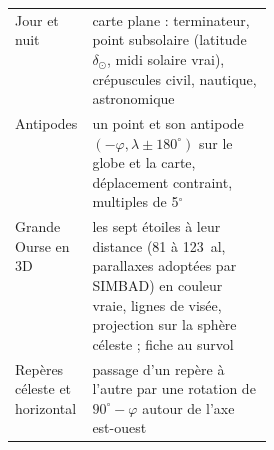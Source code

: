 \begin{center}
\begin{tabularx}{\linewidth}{@{}>{\raggedright}p{0.30\linewidth}X@{}}
Jour et nuit & carte plane : terminateur, point subsolaire (latitude $\delta_\odot$, midi solaire vrai), crépuscules civil, nautique, astronomique\\
Antipodes & un point et son antipode $(-\varphi, \lambda\pm180^\circ)$ sur le globe et la carte, déplacement contraint, multiples de 5$^\circ$\\
Grande Ourse en 3D & les sept étoiles à leur distance (81 à 123~al, parallaxes adoptées par SIMBAD) en couleur vraie, lignes de visée, projection sur la sphère céleste ; fiche au survol\\
Repères céleste et horizontal & passage d'un repère à l'autre par une rotation de $90^\circ-\varphi$ autour de l'axe est-ouest\\
\bottomrule
\end{tabularx}
\end{center}

